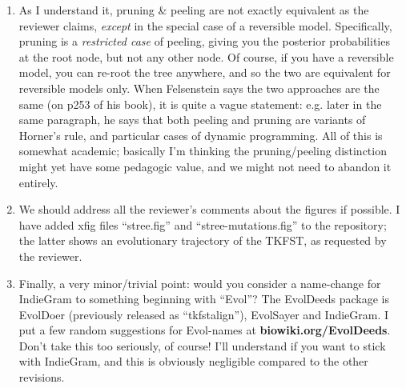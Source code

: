 {\begin{enumerate}
We can note that even though we constrain the phylogeny, more realistic phylogenetic applications are possible.
Given a structural phylo-alignment (tree+alignment+structure), we can calculate the likelihood; therefore, given two such structural phylo-alignments,
we can say which one is more probable (describe their relative posterior probabilities, etc.).
From this it is possible to make a crude MCMC sampler, just by proposing/accepting/rejecting alignment/tree/structure changes.
An {\em efficient} MCMC sampler needs to be able to make local topology changes and to resample the multiple alignment around a topology change;
we can do this too, in principle, but it's beyond this paper.
%
\item As I understand it, pruning \& peeling are not exactly equivalent as the reviewer claims, {\em except} in the special case of a reversible model.
Specifically, pruning is a {\em restricted case} of peeling, giving you the posterior probabilities at the root node, but not any other node.
Of course, if you have a reversible model, you can re-root the tree anywhere, and so the two are equivalent for reversible models only.
When Felsenstein says the two approaches are the same (on p253 of his book), it is quite a vague statement:
e.g. later in the same paragraph, he says that both peeling and pruning are variants of Horner's rule, and particular cases of dynamic programming.
All of this is somewhat academic; basically I'm thinking the pruning/peeling distinction might yet have some pedagogic value, and we might not need to abandon it entirely.
%
\item We should address all the reviewer's comments about the figures if possible.
I have added xfig files ``stree.fig'' and ``stree-mutations.fig'' to the repository; the latter shows an evolutionary trajectory of the TKFST, as requested by the reviewer.
%
\item Finally, a very minor/trivial point: would you consider a name-change for IndieGram to something beginning with ``Evol''?
The EvolDeeds package is EvolDoer (previously released as ``tkfstalign''), EvolSayer and IndieGram.
I put a few random suggestions for Evol-names at {\bf biowiki.org/EvolDeeds}.
Don't take this too seriously, of course!
I'll understand if you want to stick with IndieGram, and this is obviously negligible compared to the other revisions.
%
\end{enumerate}
\hrulefill{}}

